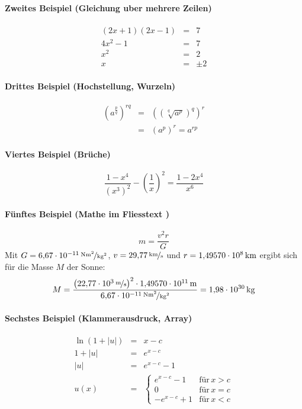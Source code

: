 \documentclass[12pt]{report}
\newcommand\e[1]{\cdot 10^{#1}}
\begin{document}
\paragraph{Zweites Beispiel (Gleichung uber mehrere Zeilen)}
\begin{eqnarray}
(2x + 1)(2x - 1) &=& 7 \nonumber \\
4x^2 - 1 &=& 7 \nonumber \\
x^2 &=& 2  \nonumber\\
x &=& \pm 2
\end{eqnarray}
\paragraph{Drittes Beispiel (Hochstellung, Wurzeln)}
\begin{eqnarray}
\left( a^{\frac{p}{q}} \right)^{rq} &=& \left( \left( \sqrt[q]{a^p} \right)^q \right)^r \nonumber \\
&=& (a^p)^r = a^{rp}
\end{eqnarray}
\paragraph{Viertes Beispiel (Brüche)}
\begin{equation}
\frac{1-x^4}{(x^3)^2}-\left(\frac{1}{x}\right)^2=\frac{1-2x^4}{x^6}
\end{equation}

\paragraph{Fünftes Beispiel (Mathe im Fliesstext )}
\begin{equation}
m=\frac{v^2r}{G}
\end{equation}
Mit $G = \unitfrac[6{,}67 \e{-11}]{Nm^2}{kg^2}$, $v = \unitfrac[29{,}77]{km}{s}$ und $r = \unit[1{,}49570 \e{8}]{km}$ ergibt
sich für die Masse $M$ der Sonne:
\begin{equation}
M = \frac
	{\left(\unitfrac[22{,}77 \e{3}]{m}{s} \right)^2 \cdot \unit[1{,}49570 \e{11}]{m}}
	{\unitfrac[6{,}67 \e{-11}]{Nm^2}{kg^2}}
= \unit[1{,}98 \e{30}]{kg}
\end{equation}

\paragraph{Sechstes Beispiel (Klammerausdruck, Array)}
\begin{eqnarray}
\ln(1+|u|) &=& x-c \nonumber \\
1+|u| &=& e^{x-c} \nonumber \\
|u| &=& e^{x-c}-1 \nonumber \\
u(x) &=& \begin{cases}
e^{x-c}-1 & \text{für} \, x > c \\
0 & \text{für}\, x=c \\
-e^{x-c}+1 & \text{für} \, x < c
\end{cases}
\end{eqnarray}
\end{document}
